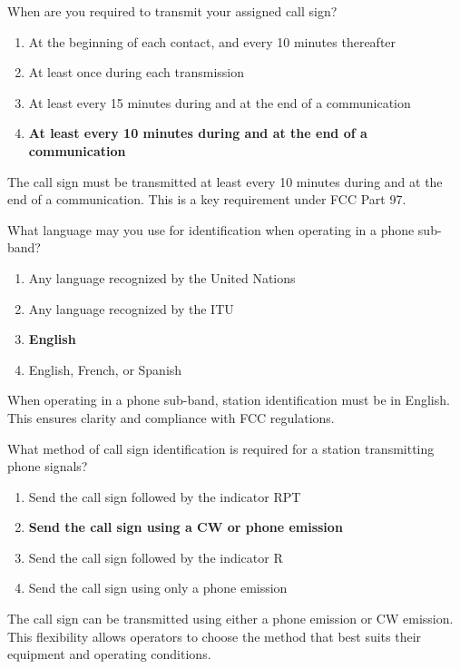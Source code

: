
\begin{tcolorbox}[colback=gray!10!white,colframe=black!75!black,title={T1F03}]
    When are you required to transmit your assigned call sign?
    \begin{enumerate}[label=\Alph*),noitemsep]
        \item At the beginning of each contact, and every 10 minutes thereafter
        \item At least once during each transmission
        \item At least every 15 minutes during and at the end of a communication
        \item \textbf{At least every 10 minutes during and at the end of a communication}
    \end{enumerate}
\end{tcolorbox}
The call sign must be transmitted at least every 10 minutes during and at the end of a communication. This is a key requirement under FCC Part 97.


\begin{tcolorbox}[colback=gray!10!white,colframe=black!75!black,title={T1F04}]
    What language may you use for identification when operating in a phone sub-band?
    \begin{enumerate}[label=\Alph*),noitemsep]
        \item Any language recognized by the United Nations
        \item Any language recognized by the ITU
        \item \textbf{English}
        \item English, French, or Spanish
    \end{enumerate}
\end{tcolorbox}
When operating in a phone sub-band, station identification must be in English. This ensures clarity and compliance with FCC regulations.


\begin{tcolorbox}[colback=gray!10!white,colframe=black!75!black,title={T1F05}]
    What method of call sign identification is required for a station transmitting phone signals?
    \begin{enumerate}[label=\Alph*),noitemsep]
        \item Send the call sign followed by the indicator RPT
        \item \textbf{Send the call sign using a CW or phone emission}
        \item Send the call sign followed by the indicator R
        \item Send the call sign using only a phone emission
    \end{enumerate}
\end{tcolorbox}
The call sign can be transmitted using either a phone emission or CW emission. This flexibility allows operators to choose the method that best suits their equipment and operating conditions.

